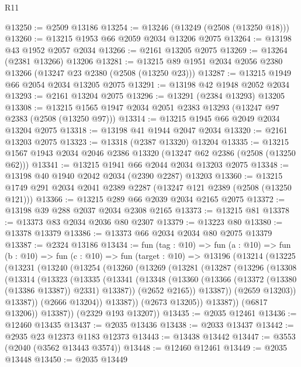 \begin{lexlean}{R11}
\begin{coremodule}
@13250 := @2509 @13186
@13254 := @13246 (@13249 (@2508 (@13250 @18)))
@13260 := @13215 @1953 @66 @2059 @2034 @13206 @2075
@13264 := @13198 @43 @1952 @2057 @2034
@13266 := @2161 @13205 @2075
@13269 := @13264 (@2381 @13266) @13206
@13281 := @13215 @89 @1951 @2034 @2056 @2380 @13266 (@13247 @23 @2380 (@2508 (@13250 @23)))
@13287 := @13215 @1949 @66 @2054 @2034 @13205 @2075
@13291 := @13198 @42 @1948 @2052 @2034
@13293 := @2161 @13204 @2075
@13296 := @13291 (@2384 @13293) @13205
@13308 := @13215 @1565 @1947 @2034 @2051 @2383 @13293 (@13247 @97 @2383 (@2508 (@13250 @97)))
@13314 := @13215 @1945 @66 @2049 @2034 @13204 @2075
@13318 := @13198 @41 @1944 @2047 @2034
@13320 := @2161 @13203 @2075
@13323 := @13318 (@2387 @13320) @13204
@13335 := @13215 @1567 @1943 @2034 @2046 @2386 @13320 (@13247 @62 @2386 (@2508 (@13250 @62)))
@13341 := @13215 @1941 @66 @2044 @2034 @13203 @2075
@13348 := @13198 @40 @1940 @2042 @2034 (@2390 @2287) @13203
@13360 := @13215 @1749 @291 @2034 @2041 @2389 @2287 (@13247 @121 @2389 (@2508 (@13250 @121)))
@13366 := @13215 @289 @66 @2039 @2034 @2165 @2075
@13372 := @13198 @39 @288 @2037 @2034 @2308 @2165
@13373 := @13215 @81
@13378 := @13373 @83 @2034 @2036 @80 @2307
@13379 := @13223 @80
@13380 := @13378 @13379
@13386 := @13373 @66 @2034 @2034 @80 @2075 @13379
@13387 := @2324 @13186
@13434 := fun (tag : @10) =>
  fun (a : @10) =>
  fun (b : @10) =>
  fun (c : @10) =>
  fun (target : @10) =>
  @13196
    (@13214
      (@13225
        (@13231
          (@13240
            (@13254
              (@13260
                (@13269
                  (@13281
                    (@13287
                      (@13296
                        (@13308
                          (@13314
                            (@13323
                              (@13335
                                (@13341
                                  (@13348
                                    (@13360 (@13366 (@13372 (@13380 (@13386 @13387)) @2331) @13387))
                                    (@2652 @2165))
                                  @13387))
                              (@2659 @13203))
                            @13387))
                        (@2666 @13204))
                      @13387))
                  (@2673 @13205))
                @13387))
            (@6817 @13206))
          @13387))
      (@2329 @193 @13207))
@13435 := @2035 @12461
@13436 := @12460 @13435
@13437 := @2035 @13436
@13438 := @2033 @13437
@13442 := @2935 @23 @12373 @1183 @12373
@13443 := @13438 @13442
@13447 := @3553 (@2040 (@3562 @13443 @3574))
@13448 := @12460 @12461
@13449 := @2035 @13448
@13450 := @2035 @13449

\end{coremodule}
\end{lexlean}
